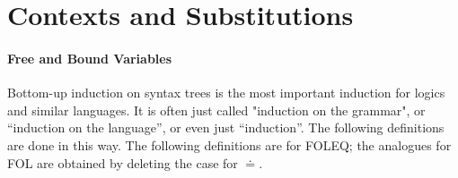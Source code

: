 %

\section{Contexts and Substitutions}

\paragraph{Free and Bound Variables}
Bottom-up induction on syntax trees is the most important induction for logics and similar languages. It is often just called "induction on the grammar", or ``induction on the language'', or even just ``induction''.
The following definitions are done in this way. The following definitions are for FOLEQ; the analogues for FOL are obtained by deleting the case for $\doteq$.


